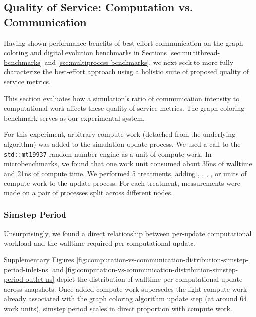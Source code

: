 \subsection{Quality of Service: Computation vs. Communication}
\label{sec:computation-vs-communication}

Having shown performance benefits of best-effort communication on the graph coloring and digital evolution benchmarks in Sections \ref{sec:multithread-benchmarks} and \ref{sec:multiprocess-benchmarks}, we next seek to more fully characterize the best-effort approach using a holistic suite of proposed quality of service metrics.

This section evaluates how a simulation's ratio of communication intensity to computational work affects these quality of service metrics.
The graph coloring benchmark serves as our experimental system.

For this experiment, arbitrary compute work (detached from the underlying algorithm) was added to the simulation update process.
We used a call to the \texttt{std::mt19937} random number engine as a unit of compute work.
In microbenchmarks, we found that one work unit consumed about 35ns of walltime and 21ns of compute time.
We performed 5 treatments, adding , , , , or  units of compute work to the update process.
For each treatment, measurements were made on a pair of processes split across different nodes.

\subsubsection{Simstep Period}

Unsurprisingly, we found a direct relationship between per-update computational workload and the walltime required per computational update.

Supplementary Figures \ref{fig:computation-vs-communication-distribution-simstep-period-inlet-ns} and \ref{fig:computation-vs-communication-distribution-simstep-period-outlet-ns} depict the distribution of walltime per computational update across snapshots.
Once added compute work supersedes the light compute work already associated with the graph coloring algorithm update step (at around 64 work units), simstep period scales in direct proportion with compute work.

